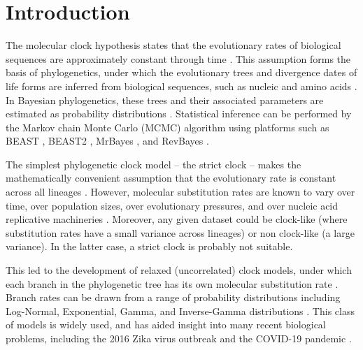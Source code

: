 \documentclass[10pt,letterpaper]{article}
\begin{document}
\clearpage
\section*{Introduction}


The molecular clock hypothesis states that the evolutionary rates of biological sequences are approximately constant through time \cite{zuckerkandl1962molecular}.
This assumption forms the basis of phylogenetics, under which the evolutionary trees and divergence dates of life forms are inferred from biological sequences, such as nucleic and amino acids \cite{douzery2003local, drummond2006relaxed}.
In Bayesian phylogenetics, these trees and their associated parameters are estimated as probability distributions \cite{kuhner1995estimating, larget1999markov, mau1999bayesian}. 
Statistical inference can be performed by the Markov chain Monte Carlo (MCMC) algorithm \cite{metropolis53, hastings70} using platforms such as BEAST \cite{drummond2012bayesian}, BEAST2 \cite{bouckaert2019beast}, MrBayes \cite{ronquist2012mrbayes}, and RevBayes \cite{hohna2016revbayes}.



The simplest phylogenetic clock model -- the strict clock -- makes the mathematically convenient assumption that the evolutionary rate is constant across all lineages \cite{zuckerkandl1965evolutionary, kuhner1995estimating, larget1999markov}.  %
However, molecular substitution rates are known to vary over time, over population sizes, over evolutionary pressures, and over nucleic acid replicative machineries \cite{gillespie1994causes, woolfit2009effective, loh2010optimization}.
Moreover, any given dataset could be clock-like (where substitution rates have a small variance across lineages) or non clock-like (a large variance). 
In the latter case, a strict clock is probably not suitable. 



This led to the development of relaxed (uncorrelated) clock models, under which each branch in the phylogenetic tree has its own molecular substitution rate  \cite{drummond2006relaxed}.
Branch rates can be drawn from a range of probability distributions including Log-Normal, Exponential, Gamma, and Inverse-Gamma distributions \cite{drummond2006relaxed, lepage2007general, li2012model}.
This class of models is widely used, and has aided insight into many recent biological problems, including the 2016 Zika virus outbreak \cite{faria2017establishment} and the COVID-19 pandemic \cite{giovanetti2020first}.
\end{document}
